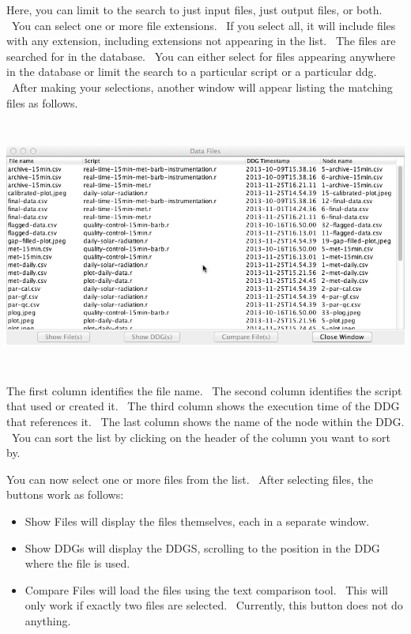 \documentclass[letterpaper]{article}
\newcommand\liststyleWWviiiNumvii{%
\renewcommand\labelitemi{•}
\renewcommand\labelitemii{•}
\renewcommand\labelitemiii{•}
\renewcommand\labelitemiv{•}
}
\begin{document}
{\mdseries\upshape\color{black}
Here, you can limit to the search to just input files, just output files, or both. \ You can select one or more file extensions. \ If you select all, it will include files with any extension, including extensions not appearing in the list. \ The files are searched for in the database. \ You can either select for files appearing anywhere in the database or limit the search to a particular script or a particular ddg. \ After making your selections, another window will appear listing the matching files as follows.}

 \includegraphics[width=6.5in,height=3.25in]{UsingDDGExplorer-img/UsingDDGExplorer-img013.png} 

{\mdseries\upshape\color{black}
The first column identifies the file name. \ The second column identifies the script that used or created it. \ The third column shows the execution time of the DDG that references it. \ The last column shows the name of the node within the DDG. \ You can sort the list by clicking on the header of the column you want to sort by.}

{\mdseries\upshape\color{black}
You can now select one or more files from the list. \ After selecting files, the buttons work as follows:}

\liststyleWWviiiNumvii
\begin{itemize}
\item {\color{black}
Show Files will display the files themselves, each in a separate window.}
\item {\color{black}
Show DDGs will display the DDGS, scrolling to the position in the DDG where the file is used.}
\item {\color{black}
Compare Files will load the files using the text comparison tool. \ This will only work if exactly two files are selected. \ Currently, this button does not do anything. }
\end{itemize}
\end{document}
